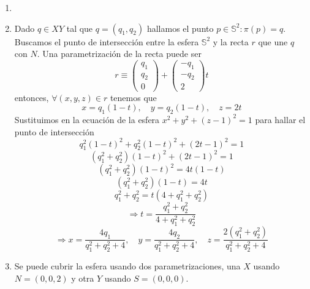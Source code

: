 \begin{sol}
  \begin{enumerate}[label=(\roman*)]
    \item []
    \item Dado $q \in XY$ tal que $q = (q_{1}, q_{2})$ hallamos el punto $p \in \mathbb{S}^{2} : \pi(p) = q$. Buscamos el punto de intersección entre la esfera $\mathbb{S}^{2}$ y la recta $r$ que une $q$ con $N$. Una parametrización de la recta puede ser
      \[ 
        r \equiv 
        \begin{pmatrix}
          q_{1} \\
          q_{2} \\
          0
        \end{pmatrix}
        +
        \begin{pmatrix}
          -q_{1} \\
          -q_{2} \\
          2
        \end{pmatrix}
        t
      \] 
      entonces, $\forall (x, y, z) \in r$ tenemos que
      \[ 
        x = q_{1}(1-t), \quad y = q_{2}(1-t), \quad z = 2t 
      \] 
      Sustituimos en la ecuación de la esfera $x^{2} + y^{2} + (z-1)^{2} = 1$ para hallar el punto de intersección
      \[ 
        q_{1}^{2}(1-t)^{2} + q_{2}^{2}(1-t)^{2} + (2t - 1)^{2} = 1 
      \] 
      \[ 
        (q_{1}^{2} + q_{2}^{2})(1-t)^{2} + (2t -1)^{2} = 1 
      \] 
      \[ 
        (q_{1}^{2} + q_{2}^{2})(1-t)^{2} = 4t(1 - t)
      \] 
      \[ 
        (q_{1}^{2} + q_{2}^{2})(1-t) = 4t
      \] 
      \[ 
        q_{1}^{2} + q_{2}^{2} = t(4 + q_{1}^{2} + q_{2}^{2})
      \] 
      \[ 
        \Rightarrow t = \frac{q_{1}^{2} + q_{2}^{2}}{4 + q_{1}^{2} + q_{2}^{2}} 
      \] 
      \[ 
        \Rightarrow x = \frac{4q_{1}}{q_{1}^{2} + q_{2}^{2} + 4}, \quad y = \frac{4q_{2}}{q_{1}^{2} + q_{2}^{2} + 4}, \quad z = \frac{2(q_{1}^{2} + q_{2}^{2})}{q_{1}^{2} + q_{2}^{2} + 4}
      \] 

    \item Se puede cubrir la esfera usando dos parametrizaciones, una $X$ usando $N = (0,0,2)$ y otra $Y$ usando $S = (0, 0, 0)$.

  \end{enumerate}
\end{sol}
